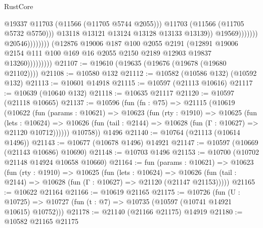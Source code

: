 \begin{lexlean}{RustCore}
\begin{coremodule}
                                                        @19337
                                                        @11703
                                                        (@11566 (@11705 @5744 @2055)))
                                                      @11703
                                                      (@11566 (@11705 @5732 @5750)))
                                                    @13118
                                                    @13121
                                                    @13124
                                                    @13128
                                                    @13133
                                                    @13139))
                                                @19569)))))))
                                  @20546))))))))
                  (@12876
                    @19006
                    @187
                    @100
                    @2055
                    @2191
                    (@12891
                      @19006
                      @2154
                      @111
                      @100
                      @169
                      @16
                      @2055
                      @2150
                      @2189
                      @12903
                      @19837
                      @13260)))))))))
@21107 := @19610 (@19635 (@19676 (@19678 (@19680 @21102))))
@21108 := @10580 @132
@21112 := @10582 (@10586 @132) (@10592 @132)
@21113 := @10601 @14918
@21115 := @10597 (@21113 @10616)
@21117 := @10639 (@10640 @132)
@21118 := @10635 @21117
@21120 := @10597 (@21118 @10665)
@21137 := @10596
    (fun (fn : @75) =>
    @21115
      (@10619
        (@10622
          (fun (params : @10621) =>
          @10623
            (fun (rty : @1910) =>
            @10625
              (fun (lets : @10624) =>
              @10626 (fun (tail : @2144) => @10628 (fun (Γ : @10627) => @21120 @10712))))))
        @10758))
    @1496
@21140 := @10764 (@21113 (@10614 @1496))
@21143 := @10677 (@10678 @1496) @14921
@21147 := @10597 (@10669 (@21143 @10686) @10690)
@21148 := @10703 @1496
@21153 := @10700 (@10702 @21148 @14924 @10658 @10660)
@21164 := fun (params : @10621) =>
  @10623
    (fun (rty : @1910) =>
    @10625
      (fun (lets : @10624) =>
      @10626 (fun (tail : @2144) => @10628 (fun (Γ : @10627) => @21120 (@21147 @21153)))))
@21165 := @10622 @21164
@21166 := @10619 @21165
@21175 := @10726
    (fun (U : @10725) => @10727 (fun (t : @7) => @10735 (@10597 (@10741 @14921 @10615) @10752)))
@21178 := @21140 (@21166 @21175) @14919
@21180 := @10582 @21165 @21175

\end{coremodule}
\end{lexlean}
